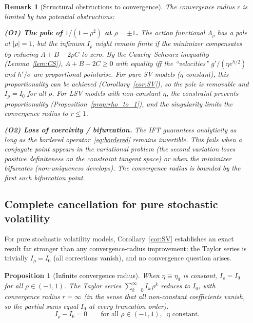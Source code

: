 \documentclass[11pt]{article}
\newtheorem{proposition}[theorem]{Proposition}
\newtheorem{remark}[theorem]{Remark}
\theoremstyle{definition}
\begin{document}
\begin{remark}[Structural obstructions to convergence]\label{rem:obstructions}
The convergence radius $r$ is limited by two potential obstructions:

\textbf{(O1) The pole of $1/(1-\rho^2)$ at $\rho = \pm 1$.} The action functional $\Lambda_\rho$ has a pole at $|\rho| = 1$, but the infimum $I_\rho$ might remain finite if the minimizer compensates by reducing $A + B - 2\rho C$ to zero. By the Cauchy--Schwarz inequality (Lemma~\ref{lem:CS}), $A + B - 2C \geq 0$ with equality iff the ``velocities'' $g'/(\eta e^{h/2})$ and $h'/\sigma$ are proportional pointwise. For pure SV models ($\eta$ constant), this proportionality \emph{can} be achieved (Corollary~\ref{cor:SV}), so the pole is removable and $I_\rho = I_0$ for all $\rho$. For LSV models with non-constant $\eta$, the constraint prevents proportionality (Proposition~\ref{prop:rho_to_1}), and the singularity limits the convergence radius to $r \leq 1$.

\textbf{(O2) Loss of coercivity / bifurcation.} The IFT guarantees analyticity as long as the bordered operator~\eqref{eq:bordered} remains invertible. This fails when a conjugate point appears in the variational problem (the second variation loses positive definiteness on the constraint tangent space) or when the minimizer bifurcates (non-uniqueness develops). The convergence radius is bounded by the first such bifurcation point.
\end{remark}

\subsection{Complete cancellation for pure stochastic volatility}\label{sec:enhanced_convergence}

For pure stochastic volatility models, Corollary~\ref{cor:SV} establishes an exact result far stronger than any convergence-radius improvement: the Taylor series is trivially $I_\rho = I_0$ (all corrections vanish), and no convergence question arises.

\begin{proposition}[Infinite convergence radius]\label{prop:doubled_radius}
When $\eta \equiv \eta_0$ is constant, $I_\rho = I_0$ for all $\rho \in (-1,1)$. The Taylor series $\sum_{k=0}^\infty I_k\,\rho^k$ reduces to $I_0$, with convergence radius $r = \infty$ (in the sense that all non-constant coefficients vanish, so the partial sums equal $I_0$ at every truncation order).
\begin{equation}\label{eq:doubled_error}
  I_\rho - I_0 = 0 \qquad \text{for all } \rho \in (-1,1),\;\; \eta \text{ constant}.
\end{equation}
\end{proposition}
\end{document}
